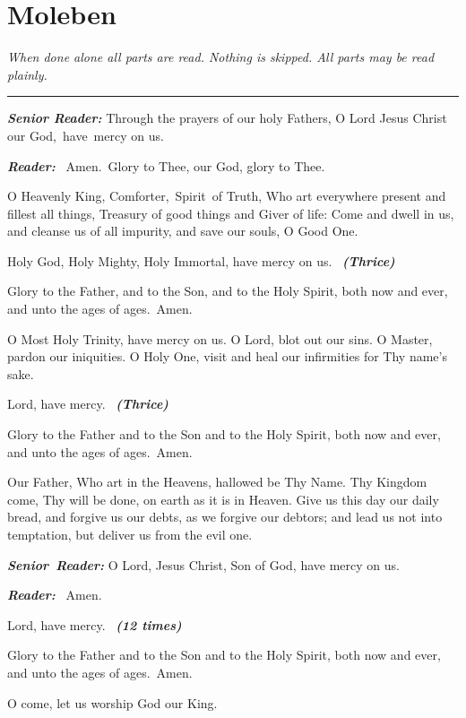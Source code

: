 \chapter{Moleben}

\emph{When done alone all parts are read. Nothing is skipped. All parts may be read plainly.}

\begin{center}
\rule{0.5\linewidth}{0.5pt}
\end{center}

\textbf{\emph{Senior Reader:}}
 Through the prayers of our holy Fathers, O Lord Jesus Christ our God,~have~mercy on us.

\textbf{\emph{Reader:}}
~Amen.~Glory to Thee, our God, glory to Thee.

O Heavenly King, Comforter,~Spirit~of Truth, Who art everywhere present and fillest all things, Treasury of good things and Giver of life: Come and dwell in us, and cleanse us of all impurity, and save our souls, O Good One.

Holy God, Holy Mighty, Holy Immortal, have mercy on
us.
~\textbf{\emph{(Thrice)}}

Glory to the Father, and to the Son, and to the Holy Spirit, both now and ever, and unto the ages of ages.~Amen.

O Most Holy Trinity, have mercy on us. O Lord, blot out our sins. O Master, pardon our iniquities. O Holy One, visit and heal our infirmities for Thy name's sake.

Lord, have mercy.
~\textbf{\emph{(Thrice)}}

Glory to the Father and to the Son and to the Holy Spirit, both now and ever, and unto the ages of ages.~Amen.

Our Father, Who art in the Heavens, hallowed be Thy Name. Thy Kingdom come, Thy will be done, on earth as it is in Heaven. Give us this day our daily bread, and forgive us our debts, as we forgive our debtors; and lead us not into temptation, but deliver us from the evil one.

\textbf{\emph{Senior~Reader:}}
 O Lord, Jesus Christ, Son of God, have mercy on us.

\textbf{\emph{Reader:}}
~Amen.

Lord, have mercy.
~\textbf{\emph{(12 times)}}

Glory to the Father and to the Son and to the Holy Spirit, both now and ever, and unto the ages of ages.~Amen.

O come, let us worship God our King.

